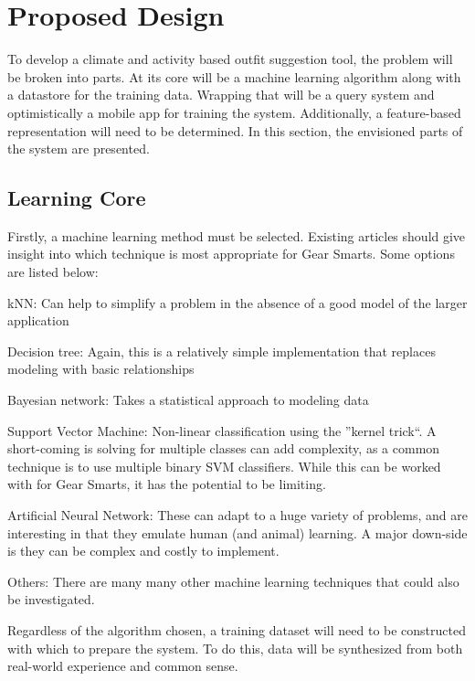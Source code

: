 \section{Proposed Design}
\label{section:propeseddesign}
To develop a climate and activity based outfit suggestion tool, the problem will be broken into parts.
At its core will be a machine learning algorithm along with a datastore for the training data. Wrapping that will
be a query system and optimistically a mobile app for training the system. Additionally, a feature-based representation
will need to be determined. In this section, the envisioned parts of the system are presented.

\subsection{Learning Core}
Firstly, a machine learning method must be selected. Existing articles should give insight into which technique is
most appropriate for Gear Smarts. Some options are listed below:

\begin{description}
  \item{kNN:} Can help to simplify a problem in the absence of a good model of the larger application
  \item{Decision tree:} Again, this is a relatively simple implementation that replaces modeling with basic relationships
  \item{Bayesian network:} Takes a statistical approach to modeling data
  \item{Support Vector Machine:} Non-linear classification using the ''kernel trick``. A short-coming is solving for multiple
  classes can add complexity, as a common technique is to use multiple binary SVM classifiers. While this can be worked with
  for Gear Smarts, it has the potential to be limiting.
  \item{Artificial Neural Network:} These can adapt to a huge variety of problems, and are interesting in that they emulate
  human (and animal) learning. A major down-side is they can be complex and costly to implement.
  \item{Others:} There are many many other machine learning techniques that could also be investigated.
\end{description}

Regardless of the algorithm chosen, a training dataset will need to be constructed with which to prepare the system. To do this,
data will be synthesized from both real-world experience and common sense.

